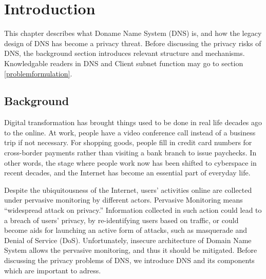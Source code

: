\documentclass[a4paper,12pt]{article}
\begin{document}
\newpage
{}
\tableofcontents %
\newpage
{}

%
%

\section{Introduction}
This chapter describes what Doname Name System (DNS) is, and how the legacy design of DNS has become a privacy threat. Before discussing the privacy risks of DNS, the background section introduces relevant structure and mechanisms. Knowledgable readers in DNS and Client subnet function may go to section \ref{problemformulation}.

\subsection{Background}
Digital transformation has brought things used to be done in real life decades ago to the online. At work, people have a video conference call instead of a business trip if not necessary. For shopping goods, people fill in credit card numbers for cross-border payments rather than visiting a bank branch to issue paychecks. In other words, the stage where people work now has been shifted to cyberspace in recent decades, and the Internet has become an essential part of everyday life.

Despite the ubiquitousness of the Internet, users' activities online are collected under pervasive monitoring by different actors.
Pervasive Monitoring means ``widespread attack on privacy\cite{rfc7258}.'' Information collected in such action could lead to a breach of users’ privacy, by re-identifying users based on traffic\cite{herrmann2010analyzing}, or could become aids for launching an active form of attacks, such as masquerade and Denial of Service (DoS).
Unfortunately, insecure architecture of Domain Name System allows the pervasive monitoring, and thus it should be mitigated. Before discussing the privacy problems of DNS, we introduce DNS and its components which are important to adress.


\end{document}
